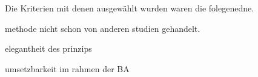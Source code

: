 Die Kriterien mit denen ausgewählt wurden waren die folegenedne.

methode nicht schon von anderen studien gehandelt.

elegantheit des prinzips

umsetzbarkeit im rahmen der BA
